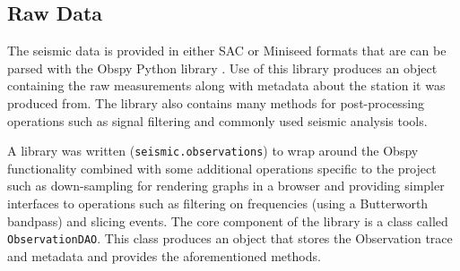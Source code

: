 \documentclass[../report.tex]{subfiles}
\begin{document}
\subsection{Raw Data}
	The seismic data is provided in either SAC or Miniseed formats that are can be parsed with the Obspy Python library \citep{obspy}.  Use of this library produces an object containing the raw measurements along with metadata about the station it was produced from.  The library also contains many methods for post-processing operations such as signal filtering and commonly used seismic analysis tools.
	
	A library was written (\verb|seismic.observations|) to wrap around the Obspy functionality combined with some additional operations specific to the project such as down-sampling for rendering graphs in a browser and providing simpler interfaces to operations such as filtering on frequencies (using a Butterworth bandpass) and slicing events.  The core component of the library is a class called \verb|ObservationDAO|.  This class produces an object that stores the Observation trace and metadata and provides the aforementioned methods.
\end{document}
